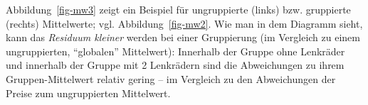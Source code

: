 \documentclass[
  a4paper,
]{scrbook}
\theoremstyle{definition}
\theoremstyle{definition}
\theoremstyle{definition}
\theoremstyle{remark}
\begin{document}
Abbildung~\ref{fig-mw3} zeigt ein Beispiel für ungruppierte (links) bzw.
gruppierte (rechts) Mittelwerte; vgl. Abbildung~\ref{fig-mw2}. Wie man
in dem Diagramm sieht, kann das \emph{Residuum kleiner} werden bei einer
Gruppierung (im Vergleich zu einem ungruppierten, ``globalen''
Mittelwert): Innerhalb der Gruppe ohne Lenkräder und innerhalb der
Gruppe mit 2 Lenkrädern sind die Abweichungen zu ihrem
Gruppen-Mittelwert relativ gering -- im Vergleich zu den Abweichungen
der Preise zum ungruppierten Mittelwert.

\begin{figure}

\begin{minipage}{0.50\linewidth}



\end{minipage}%
%
\begin{minipage}{0.50\linewidth}

\end{minipage}
\end{figure}
\end{document}

